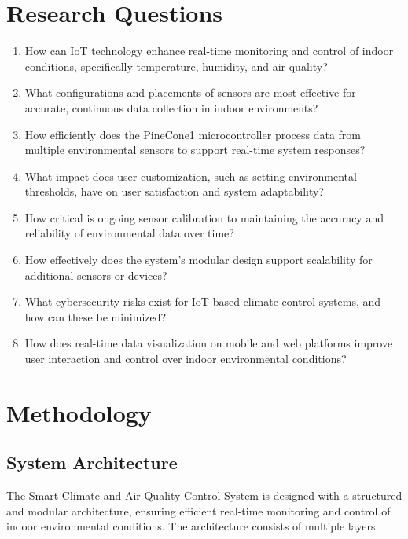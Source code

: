 \documentclass[a4paper]{scrartcl}
\begin{document}
\section{Research Questions}
\begin{enumerate}
    \item How can IoT technology enhance real-time monitoring and control of indoor conditions, specifically temperature, humidity, and air quality?
    \item What configurations and placements of sensors are most effective for accurate, continuous data collection in indoor environments?
    \item How efficiently does the PineCone1 microcontroller process data from multiple environmental sensors to support real-time system responses?
    \item What impact does user customization, such as setting environmental thresholds, have on user satisfaction and system adaptability?
    \item How critical is ongoing sensor calibration to maintaining the accuracy and reliability of environmental data over time?
    \item How effectively does the system’s modular design support scalability for additional sensors or devices?
    \item What cybersecurity risks exist for IoT-based climate control systems, and how can these be minimized?
    \item How does real-time data visualization on mobile and web platforms improve user interaction and control over indoor environmental conditions?
\end{enumerate}

\section{Methodology}
\subsection{System Architecture}
The Smart Climate and Air Quality Control System is designed with a structured and modular architecture, ensuring efficient real-time monitoring and control of indoor environmental conditions. The architecture consists of multiple layers:
\end{document}
